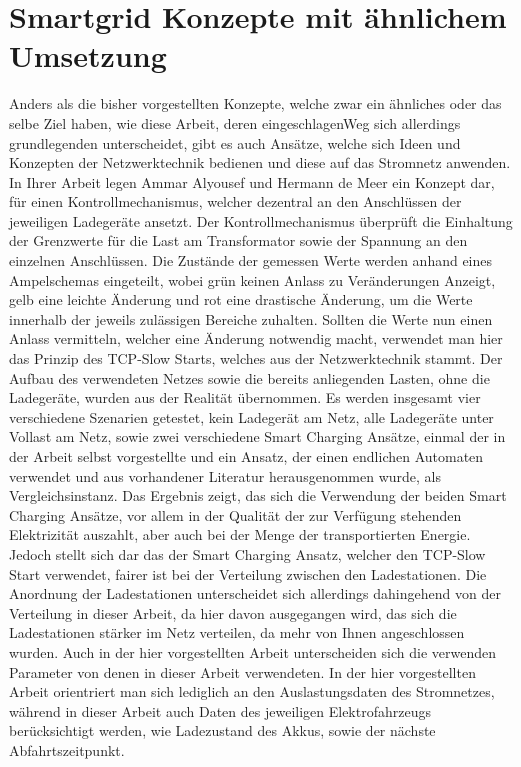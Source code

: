 \section{Smartgrid Konzepte mit ähnlichem Umsetzung}
Anders als die bisher vorgestellten Konzepte, welche zwar ein ähnliches oder das selbe Ziel haben, wie diese Arbeit, deren eingeschlagenWeg sich allerdings grundlegenden unterscheidet, gibt es auch Ansätze, welche sich Ideen und Konzepten der Netzwerktechnik bedienen und diese auf das Stromnetz anwenden. \\
In Ihrer Arbeit \cite{RW_3_1} legen  Ammar  Alyousef und Hermann de Meer ein Konzept dar, für einen Kontrollmechanismus, welcher dezentral an den Anschlüssen der jeweiligen Ladegeräte ansetzt. Der Kontrollmechanismus überprüft die Einhaltung der Grenzwerte für die Last am Transformator sowie der Spannung an den einzelnen Anschlüssen. Die Zustände der gemessen Werte werden anhand eines Ampelschemas eingeteilt, wobei grün keinen Anlass zu Veränderungen Anzeigt, gelb eine leichte Änderung und rot eine drastische Änderung, um die Werte innerhalb der jeweils zulässigen Bereiche zuhalten. Sollten die Werte nun einen Anlass vermitteln, welcher eine Änderung notwendig macht, verwendet man hier das Prinzip des TCP-Slow Starts, welches aus der Netzwerktechnik stammt. Der Aufbau des verwendeten Netzes sowie die bereits anliegenden Lasten, ohne die Ladegeräte, wurden aus der Realität übernommen. Es werden insgesamt vier verschiedene Szenarien getestet, kein Ladegerät am Netz, alle Ladegeräte unter Vollast am Netz, sowie zwei verschiedene Smart Charging Ansätze, einmal der in der Arbeit selbst vorgestellte und ein Ansatz, der einen endlichen Automaten verwendet und aus vorhandener Literatur herausgenommen wurde, als Vergleichsinstanz. Das Ergebnis zeigt, das sich die Verwendung der beiden Smart Charging Ansätze, vor allem in der Qualität der zur Verfügung stehenden Elektrizität auszahlt, aber auch bei der Menge der transportierten Energie. Jedoch stellt sich dar das der Smart Charging Ansatz, welcher den TCP-Slow Start verwendet, fairer ist bei der Verteilung zwischen den Ladestationen. Die Anordnung der Ladestationen unterscheidet sich allerdings dahingehend von der Verteilung in dieser Arbeit, da hier davon ausgegangen wird, das sich die Ladestationen stärker im Netz verteilen, da mehr von Ihnen angeschlossen wurden. Auch in der hier vorgestellten Arbeit unterscheiden sich die verwenden Parameter von denen in dieser Arbeit verwendeten. In der hier vorgestellten Arbeit orientriert man sich lediglich an den Auslastungsdaten des Stromnetzes, während in dieser Arbeit auch Daten des jeweiligen Elektrofahrzeugs berücksichtigt werden, wie Ladezustand des Akkus, sowie der nächste Abfahrtszeitpunkt.
\\
\\





